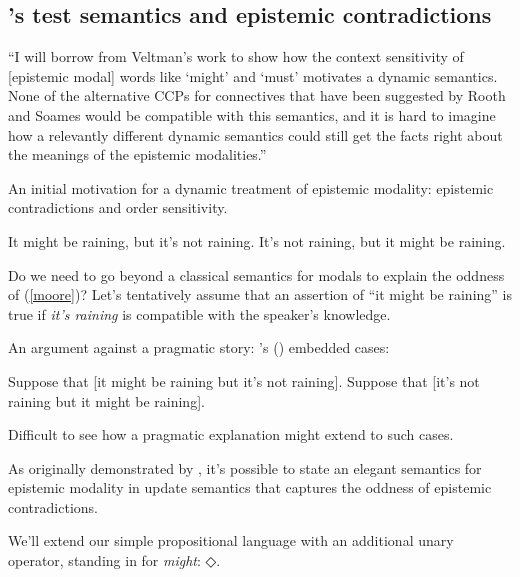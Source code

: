 \documentclass[nols,twoside,nofonts,nobib,nohyper]{tufte-handout}
\theoremstyle{definition}
\begin{document}
\subsection{\citeauthor{Veltman1996}'s test semantics and epistemic contradictions}


\begin{displayquote}
  \enquote{I will borrow from Veltman’s work to show how the context sensitivity of [epistemic modal] words like `might' and `must' motivates a dynamic semantics. None of the alternative CCPs for connectives
that have been suggested by Rooth and Soames would be compatible with this semantics, and it is hard to imagine how a relevantly different dynamic semantics could still get the facts right about the meanings of the epistemic modalities.}
\end{displayquote}

An initial motivation for a dynamic treatment of epistemic modality: epistemic contradictions and order sensitivity.

\pex\label{moore}
\a{}It might be raining, but it's not raining.\label{moore1}
\a\ljudge{\#}It's not raining, but it might be raining.\label{moore2}
\xe

Do we need to go beyond a classical semantics for modals to explain the oddness of (\ref{moore})? Let's tentatively assume that an assertion of \enquote{it might be raining} is true if \textit{it's raining} is compatible with the speaker's knowledge.

An argument against a pragmatic story: \citeauthor{Yalcin2007}'s (\citeyear{Yalcin2007}) embedded cases:

\pex
\a{}Suppose that [it might be raining but it's not raining].
\a{}Suppose that [it's not raining but it might be raining].
\xe

Difficult to see how a pragmatic explanation might extend to such cases.

As originally demonstrated by \citet{Veltman1996}, it's possible to state an elegant semantics for epistemic modality in update semantics that captures the oddness of epistemic contradictions.

We'll extend our simple propositional language with an additional unary operator, standing in for \textit{might}: $◇$.
\end{document}
